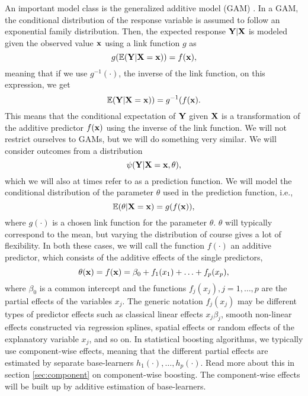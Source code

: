 An important model class is the generalized additive model (GAM) \citep{gam-book}. In a GAM, the conditional distribution of the response variable is assumed to follow an exponential family distribution. Then, the expected response $\mathbf{Y}|\mathbf{X}$ is modeled given the observed value $\mathbf{x}$ using a link function $g$ as
\begin{equation}
    g(\mathbb{E}(\mathbf{Y}|\mathbf{X}=\mathbf{x}))=f(\mathbf{x}),
\end{equation}
meaning that if we use $g^{-1}(\cdot)$, the inverse of the link function, on this expression, we get
\begin{equation}
    \mathbb{E}(\mathbf{Y}|\mathbf{X}=\mathbf{x}))=g^{-1}(f(\mathbf{x}).
\end{equation}
This means that the conditional expectation of $\mathbf{Y}$ given $\mathbf{X}$ is a transformation of the additive predictor $f(\mathbf{x})$ using the inverse of the link function.
We will not restrict ourselves to GAMs, but we will do something very similar. We will consider outcomes from a distribution
\begin{equation}
    \psi(\mathbf{Y}|\mathbf{X}=\mathbf{x},\theta),
\end{equation}
which we will also at times refer to as a prediction function. We will model the conditional distribution of the parameter $\theta$ used in the prediction function, i.e.,
\begin{equation}
    \mathbb{E}(\theta|\mathbf{X}=\mathbf{x})=g(f(\mathbf{x})),
\end{equation}
where $g(\cdot)$ is a chosen link function for the parameter $\theta$. $\theta$ will typically correspond to the mean, but varying the distribution of course gives a lot of flexibility. In both these cases, we will call the function $f(\cdot)$ an additive predictor, which consists of the additive effects of the single predictors,
\begin{equation}\label{eq:gam}
    \theta(\mathbf{x})=f(\mathbf{x})=\beta_0+f_1(x_1)+\ldots+f_p(x_p),
\end{equation}
where $\beta_0$ is a common intercept and the functions $f_j(x_j),j=1,\ldots,p$ are the partial effects of the variables $x_j$. The generic notation $f_j(x_j)$ may be different types of predictor effects such as classical linear effects $x_j\beta_j$, smooth non-linear effects constructed via regression splines, spatial effects or random effects of the explanatory variable $x_j$, and so on. In statistical boosting algorithms, we typically use component-wise effects, meaning that the different partial effects are estimated by separate base-learners $h_1(\cdot),\ldots,h_p(\cdot)$. Read more about this in section \ref{sec:component} on component-wise boosting. The component-wise effects will be built up by additive estimation of base-learners.

